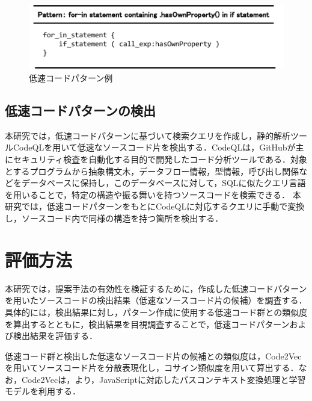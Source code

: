 \documentclass[submit,techrep,noauthor]{ipsj}
\newcommand{\todo}[1]{\colorbox{yellow}{{\bf TODO}:}{\color{red} {\textbf{[#1]}}}}
\begin{document}
\begin{figure}[!h]
    \centering
    \includegraphics[width=1.0\linewidth]{./Noguchi_fig/slow_pattern.pdf}
    \caption{低速コードパターン例}
    \label{fig:slow_pattern}
\end{figure}



\subsection{低速コードパターンの検出}

本研究では，低速コードパターンに基づいて検索クエリを作成し，静的解析ツールCodeQL\cite{ql}を用いて低速なソースコード片を検出する．CodeQLは，GitHubが主にセキュリティ検査を自動化する目的で開発したコード分析ツールである．対象とするプログラムから抽象構文木，データフロー情報，型情報，呼び出し関係などをデータベースに保持し，このデータベースに対して，SQLに似たクエリ言語を用いることで，特定の構造や振る舞いを持つソースコードを検索できる．
本研究では，低速コードパターンをもとにCodeQLに対応するクエリに手動で変換し，ソースコード内で同様の構造を持つ箇所を検出する．


\section{評価方法}
\label{sec:evaluation}

本研究では，提案手法の有効性を検証するために，作成した低速コードパターンを用いたソースコードの検出結果（低速なソースコード片の候補）を調査する．具体的には，検出結果に対し，パターン作成に使用する低速コード群との類似度を算出するとともに，検出結果を目視調査することで，低速コードパターンおよび検出結果を評価する．

低速コード群と検出した低速なソースコード片の候補との類似度は，Code2Vec\cite{code2vec}を用いてソースコード片を分散表現化し，コサイン類似度を用いて算出する．なお，Code2Vecは，\cite{saiki}より，JavaScriptに対応したパスコンテキスト変換処理と学習モデルを利用する．

\end{document}
